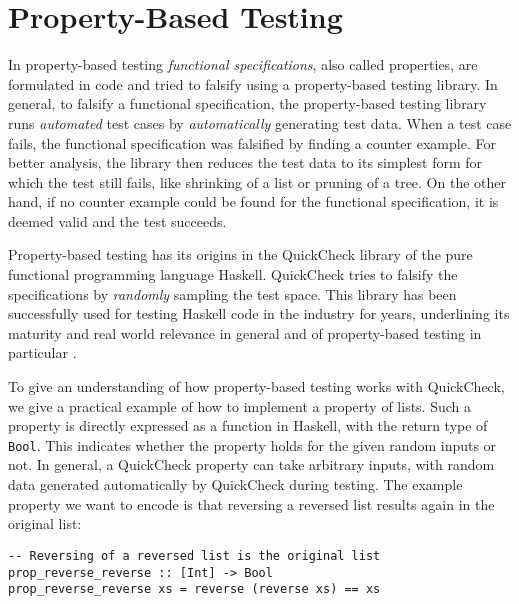 \section{Property-Based Testing}
\label{sec:proptesting}
In property-based testing \textit{functional specifications}, also called properties, are formulated in code and tried to falsify using a property-based testing library. In general, to falsify a functional specification, the property-based testing library runs \textit{automated} test cases by \textit{automatically} generating test data. When a test case fails, the functional specification was falsified by finding a counter example. For better analysis, the library then reduces the test data to its simplest form for which the test still fails, like shrinking of a list or pruning of a tree. On the other hand, if no counter example could be found for the functional specification, it is deemed valid and the test succeeds.

Property-based testing has its origins in the QuickCheck library \cite{claessen_quickcheck_2000,claessen_testing_2002} of the pure functional programming language Haskell. QuickCheck tries to falsify the specifications by \textit{randomly} sampling the test space. This library has been successfully used for testing Haskell code in the industry for years, underlining its maturity and real world relevance in general and of property-based testing in particular \cite{hughes_quickcheck_2007}.

To give an understanding of how property-based testing works with QuickCheck, we give a practical example of how to implement a property of lists. Such a property is directly expressed as a function in Haskell, with the return type of \texttt{Bool}. This indicates whether the property holds for the given random inputs or not. In general, a QuickCheck property can take arbitrary inputs, with random data generated automatically by QuickCheck during testing. The example property we want to encode is that reversing a reversed list results again in the original list:

\begin{footnotesize}
\begin{verbatim}
-- Reversing of a reversed list is the original list
prop_reverse_reverse :: [Int] -> Bool
prop_reverse_reverse xs = reverse (reverse xs) == xs
\end{verbatim}
\end{footnotesize}

